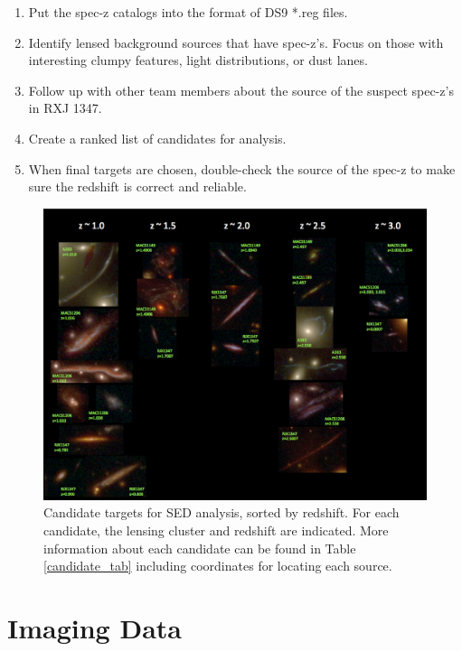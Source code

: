 \documentclass[preprint,12pt]{aastex}
\begin{document}
\vspace{-0.1in}
\begin{enumerate}\itemsep-6pt
\item{Put the spec-z catalogs into the format of DS9 *.reg files.}
\item{Identify lensed background sources that have spec-z's.  Focus on
those with interesting clumpy features, light distributions, or dust
lanes.} 
\item{Follow up with other team members about the source of the
  suspect spec-z's in RXJ 1347.}
\item{Create a ranked list of candidates for analysis.}
\item{When final targets are chosen, double-check the source of the
  spec-z to make sure the redshift is correct and reliable.}
\end{enumerate}


\begin{figure}[!t]
\includegraphics[width=1.0\linewidth]{candidates.eps}
\caption{Candidate targets for SED analysis, sorted by redshift.  For
  each candidate, the lensing cluster and redshift are indicated.
  More information about each candidate can be found in Table
  \ref{candidate_tab} including coordinates for locating each source.}
\label{candidate_fig}
\end{figure}



\section{Imaging Data}\label{imaging}
\end{document}
